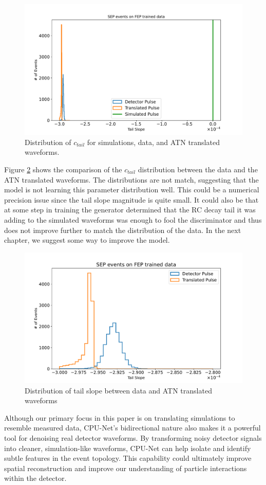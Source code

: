 \begin{figure}%
\centering
\includegraphics[width=0.9\linewidth,trim={2pc 0pc 2pc 0pc},clip]{ch8/figs/SEP_ts_with_sim.pdf}
\caption{Distribution of $c_{tail}$ for simulations, data, and ATN translated waveforms.}
\label{ch8_fig_tail_slope_comp}
\end{figure}

Figure \ref{ch8_fig_tail_slope_sim} shows the comparison of the $c_{tail}$ distribution between the data and the ATN translated waveforms. The distributions are not match, suggesting that the model is not learning this parameter distribution well. This could be a numerical precision issue since the tail slope magnitude is quite small. It could also be that at some step in training the generator determined that the RC decay tail it was adding to the simulated waveforms was enough to fool the discriminator and thus does not improve further to match the distribution of the data. In the next chapter, we suggest some way to improve the model.


\begin{figure}%
\centering
\includegraphics[width=0.9\linewidth,trim={2pc 0pc 2pc 0pc},clip]{ch8/figs/SEP_ts.pdf}
\caption{Distribution of tail slope between data and ATN translated waveforms}
\label{ch8_fig_tail_slope_sim}
\end{figure}

Although our primary focus in this paper is on translating simulations to resemble measured data, CPU-Net’s bidirectional nature also makes it a powerful tool for denoising real detector waveforms. By transforming noisy detector signals into cleaner, simulation-like waveforms, CPU-Net can help isolate and identify subtle features in the event topology. This capability could ultimately improve spatial reconstruction and improve our understanding of particle interactions within the detector.
